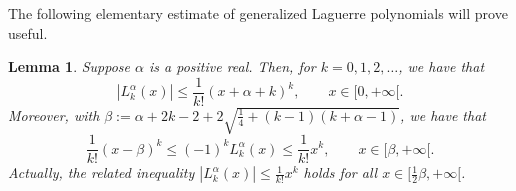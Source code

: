 \documentclass{birkart}
\newtheorem{lem}[thm]{Lemma}
\theoremstyle{definition}
\theoremstyle{remark}
\numberwithin{equation}{section}
\numberwithin{figure}{section}
\newcommand{\1}{{\mathbf 1}}
\begin{document}
The following elementary estimate of generalized Laguerre polynomials will 
prove useful.
 
\begin{lem} 
\label{laguerreestimaatti}
%
Suppose $\alpha$ is a positive real. Then, for $k=0,1,2,\ldots$, we have that 
\[
|L^\alpha_k(x)|\le \frac{1}{k!}(x+\alpha+k)^k,\qquad x\in
[0,+\infty[.
\]
Moreover, with $\beta:=\alpha+2k-2+2\sqrt{\frac14+(k-1)(k+\alpha-1)}$,
we have that
\[
\frac{1}{k!}(x-\beta)^k\le (-1)^k L_k^{\alpha}(x)\le\frac{1}{k!}x^k,\qquad
x\in[\beta,+\infty[.
\]
Actually, the related inequality $|L_k^{\alpha}(x)|\le\frac{1}{k!}x^k$ holds 
for all $x\in[\frac12\beta,+\infty[$. 
\end{lem}
\end{document}
